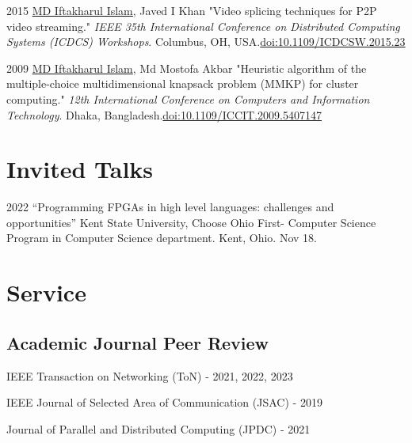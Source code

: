 \documentclass[11pt,letterpaper]{report}
\newcommand{\listitemspace}{0.25em}
\renewenvironment{itemize}
{\begin{list}{}{\setlength{\leftmargin}{0em}
                \setlength{\parskip}{0em}
                \setlength{\itemsep}{\listitemspace}
                \setlength{\parsep}{\listitemspace}}}
{\end{list}}
\begin{document}
\begin{tablist}
        \item[2015] \tab{}\underline{MD Iftakharul Islam}, Javed I Khan "Video splicing techniques for P2P video streaming." \textit{IEEE 35th International Conference on Distributed Computing Systems (ICDCS) Workshops}. Columbus, OH, USA.\@ \href{https://ieeexplore.ieee.org/document/7165086}{doi:10.1109/ICDCSW.2015.23}

        \item[2009] \tab{}\underline{MD Iftakharul Islam}, Md Mostofa Akbar "Heuristic algorithm of the multiple-choice multidimensional knapsack problem (MMKP) for cluster computing." \textit{12th International Conference on Computers and Information Technology}. Dhaka, Bangladesh.\@ \href{https://ieeexplore.ieee.org/document/5407147}{doi:10.1109/ICCIT.2009.5407147}
        
    \end{tablist}




    \section*{Invited Talks}

    \begin{tablist}

        \item[2022] \tab{}\enquote{Programming FPGAs in high level languages: challenges and opportunities} Kent State University, Choose Ohio First- Computer Science Program in Computer Science department. Kent, Ohio. Nov 18.


    \end{tablist}

    \section*{Service}


    \subsection*{Academic Journal Peer Review}

	\begin{itemize}
		\item IEEE Transaction on Networking (ToN) - 2021, 2022, 2023
		\item IEEE Journal of Selected Area of Communication (JSAC) - 2019
		\item Journal of Parallel and Distributed Computing (JPDC) - 2021
	\end{itemize}
\end{document}
